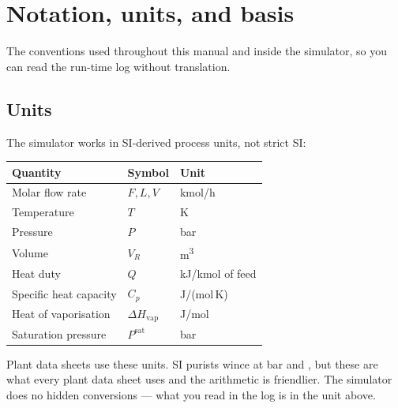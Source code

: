 \documentclass[11pt,a4paper]{article}
\newcommand{\Psat}{P^{\mathrm{sat}}}
\newcommand{\Hvap}{\Delta H_{\!\mathrm{vap}}}
\begin{document}
\section{Notation, units, and basis}

\begin{whatyoulllearn}
The conventions used throughout this manual and inside the simulator,
so you can read the run-time log without translation.
\end{whatyoulllearn}

\subsection{Units}

The simulator works in SI-derived process units, not strict SI:

\begin{center}\small
\begin{tabularx}{0.85\linewidth}{@{}lll@{}}
\toprule
\textbf{Quantity}              & \textbf{Symbol}        & \textbf{Unit} \\
\midrule
Molar flow rate                 & $F, L, V$              & kmol/h \\
Temperature                     & $T$                    & K \\
Pressure                        & $P$                    & bar \\
Volume                          & $V_R$                  & m\textsuperscript{3} \\
Heat duty                       & $Q$                    & kJ/kmol of feed \\
Specific heat capacity          & $C_p$                  & J/(mol\,K) \\
Heat of vaporisation            & $\Hvap$                & J/mol \\
Saturation pressure             & $\Psat$                & bar \\
\bottomrule
\end{tabularx}
\end{center}

\begin{intuition}
Plant data sheets use these units. SI purists wince at bar and
, but these are what every plant data sheet uses and the
arithmetic is friendlier. The simulator does no hidden conversions ---
what you read in the log is in the unit above.
\end{intuition}
\end{document}

